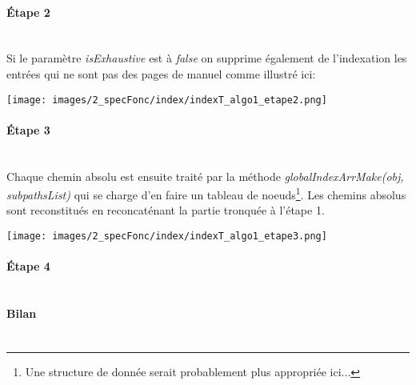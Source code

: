 \documentclass[./standalone.tex]{subfiles}
\begin{document}
\newpage
\paragraph{Étape 2\\\\}
Si le paramètre \textit{isExhaustive} est à \textit{false} on supprime également de l'indexation les entrées qui ne sont pas des pages de manuel comme illustré ici:\\
\begin{center}
	\texttt{[image: images/2\_specFonc/index/indexT\_algo1\_etape2.png]}
	\label{fig:indexT_algo1_etape2}
\end{center}

\newpage
\paragraph{Étape 3\\\\}
Chaque chemin absolu est ensuite traité par la méthode \textit{globalIndexArrMake(obj, subpathsList)} qui se charge d'en faire un tableau de noeuds\footnote{Une structure de donnée serait probablement plus appropriée ici...}. Les chemins absolus sont reconstitués en reconcaténant la partie tronquée à l'étape 1.
\begin{center}
	\texttt{[image: images/2\_specFonc/index/indexT\_algo1\_etape3.png]}
	\label{fig:indexT_algo1_etape2}
\end{center}

\paragraph{Étape 4\\\\}

\paragraph{Bilan\\\\}
\end{document}
